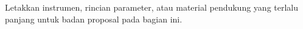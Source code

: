 Letakkan instrumen, rincian parameter, atau material pendukung yang terlalu
panjang untuk badan proposal pada bagian ini.

